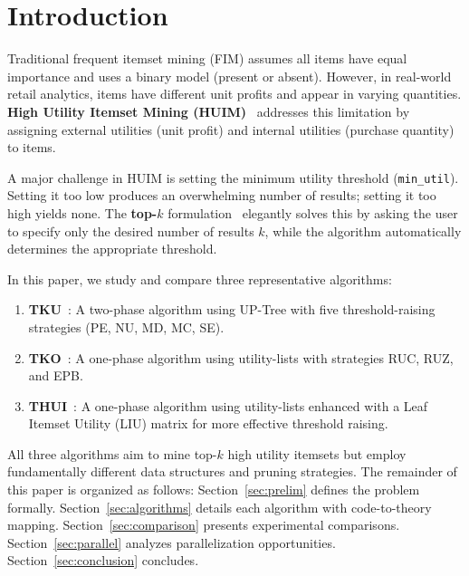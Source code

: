 \section{Introduction}
\label{sec:intro}

Traditional frequent itemset mining (FIM) assumes all items have equal importance and uses a binary model (present or absent). However, in real-world retail analytics, items have different unit profits and appear in varying quantities. \textbf{High Utility Itemset Mining (HUIM)}~\cite{ref_hui_survey} addresses this limitation by assigning external utilities (unit profit) and internal utilities (purchase quantity) to items.

A major challenge in HUIM is setting the minimum utility threshold (\texttt{min\_util}). Setting it too low produces an overwhelming number of results; setting it too high yields none. The \textbf{top-$k$} formulation~\cite{ref_tku_paper} elegantly solves this by asking the user to specify only the desired number of results $k$, while the algorithm automatically determines the appropriate threshold.

In this paper, we study and compare three representative algorithms:
\begin{enumerate}
    \item \textbf{TKU}~\cite{ref_tku_paper}: A two-phase algorithm using UP-Tree with five threshold-raising strategies (PE, NU, MD, MC, SE).
    \item \textbf{TKO}~\cite{ref_tku_paper}: A one-phase algorithm using utility-lists with strategies RUC, RUZ, and EPB.
    \item \textbf{THUI}~\cite{ref_thui}: A one-phase algorithm using utility-lists enhanced with a Leaf Itemset Utility (LIU) matrix for more effective threshold raising.
\end{enumerate}

All three algorithms aim to mine top-$k$ high utility itemsets but employ fundamentally different data structures and pruning strategies. The remainder of this paper is organized as follows: Section~\ref{sec:prelim} defines the problem formally. Section~\ref{sec:algorithms} details each algorithm with code-to-theory mapping. Section~\ref{sec:comparison} presents experimental comparisons. Section~\ref{sec:parallel} analyzes parallelization opportunities. Section~\ref{sec:conclusion} concludes.